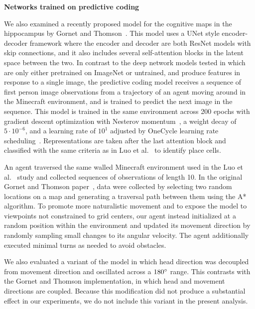 \documentclass[11pt]{article}
\begin{document}
{\bf Networks trained on predictive coding}

We also examined a recently proposed model for the cognitive maps in the hippocampus by Gornet and Thomson~\cite{Gornet2024automated}. This model uses a UNet style encoder-decoder framework where the encoder and decoder are both ResNet models with skip connections, and it also includes several self-attention blocks in the latent space between the two. In contrast to the deep network models tested in \cite{Luo2024} which are only either pretrained on ImageNet or untrained, and produce features in response to a single image, the predictive coding model receives a sequence of first person image observations from a trajectory of an agent moving around in the Minecraft environment, and is trained to predict the next image in the sequence. This model is trained in the same environment across 200 epochs with gradient descent optimization with Nesterov momentum~\cite{Sutskever2013}, a weight decay of $5 \cdot 10^{-6}$, and a learning rate of $10^1$ adjusted by OneCycle learning rate scheduling~\cite{SmithTopin2019}.
Representations are taken after the last attention block and classified with the same criteria as in Luo et al.~\cite{Luo2024} to identify place cells. 

An agent traversed the same walled Minecraft environment used in the Luo et al.~\cite{Luo2024} study and collected sequences of observations of length 10. In the original Gornet and Thomson paper~\cite{Gornet2024}, data were collected by selecting two random locations on a map and generating a traversal path between them using the A* algorithm. To promote more naturalistic movement and to expose the model to viewpoints not constrained to grid centers, our agent instead initialized at a random position within the environment and updated its movement direction by randomly sampling small changes to its angular velocity. The agent additionally executed minimal turns as needed to avoid obstacles.

We also evaluated a variant of the model in which head direction was decoupled from movement direction and oscillated across a $180\degree$ range. This contrasts with the Gornet and Thomson implementation, in which head and movement directions are coupled. Because this modification did not produce a substantial effect in our experiments, we do not include this variant in the present analysis.
\end{document}
